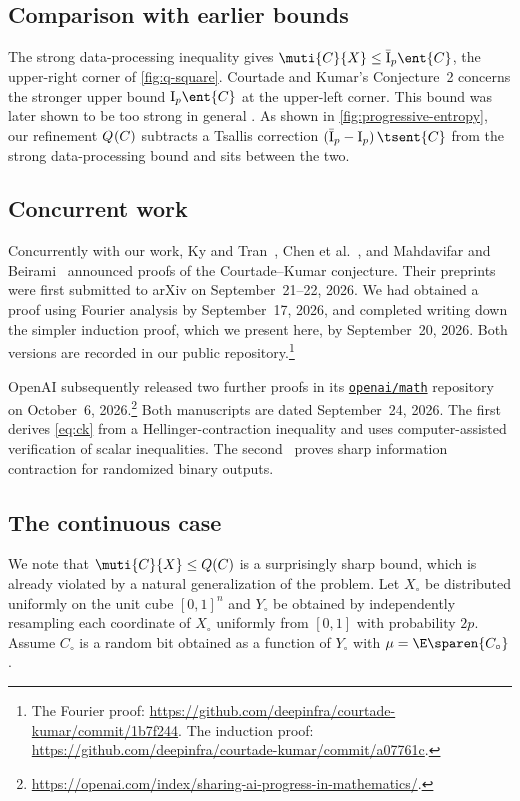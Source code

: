 \subsection{Comparison with earlier bounds}
\label{sec:earlier}
The strong data-processing inequality \cite{AhlswedeG1976}
gives $\muti{C}{X}\le\qI\ent{C}$,
the upper-right corner of \autoref{fig:q-square}.
Courtade and Kumar's \cite{CourtadeK2014} Conjecture~2
concerns the stronger upper bound $\sI\ent{C}$ at the upper-left
corner. This bound was later shown to be too strong in
general \cite{ChandarT2014,KindlerOW2015}.
As shown in \autoref{fig:progressive-entropy}, our refinement
$Q{\mkern-2mu}\left(C\right)$ subtracts a Tsallis correction
$(\qI-\sI)\,\tsent{C}$ from the strong data-processing bound
and sits between the two.


\subsection{Concurrent work}
\label{sec:concurrent}
Concurrently with our work, Ky and Tran~\cite{KyT2026},
Chen et al.~\cite{ChenGJL+2026}, and Mahdavifar and
Beirami~\cite{MahdavifarB2026} announced proofs of the
Courtade--Kumar conjecture. Their preprints were first
submitted to arXiv on September~21--22, 2026.
We had obtained a proof using Fourier analysis by
September~17, 2026, and completed writing down the simpler
induction proof, which we present here, by September~20, 2026.
Both versions are recorded in our public repository.\footnote{%
The Fourier proof:
\url{https://github.com/deepinfra/courtade-kumar/commit/1b7f244}.
The induction proof:
\url{https://github.com/deepinfra/courtade-kumar/commit/a07761c}.}

OpenAI subsequently released two further proofs in its
\href{https://github.com/openai/math}{\texttt{openai/math}} repository on October~6,
2026.\footnote{\url{https://openai.com/index/sharing-ai-progress-in-mathematics/}.}
Both manuscripts are dated September~24, 2026.
The first~\cite{OpenAI2026a} derives \eqref{eq:ck} from a
Hellinger-contraction inequality and uses computer-assisted
verification of scalar inequalities.
The second~\cite{OpenAI2026b} proves sharp information
contraction for randomized binary outputs.

\subsection{The continuous case}
\label{sec:continuous}
We note that $\muti{C}{X}\le \Q$ is a surprisingly sharp
bound, which is already violated by a natural
generalization of the problem.
Let $X_\circ$ be distributed uniformly on the unit cube
$[0,1]^n$ and $Y_\circ$ be obtained by independently
resampling each coordinate of $X_\circ$ uniformly from
$[0,1]$ with probability $2p$.
Assume $C_\circ$ is a random bit obtained as a
function of $Y_\circ$ with $\mu=\E\sparen{C_\circ}$.

